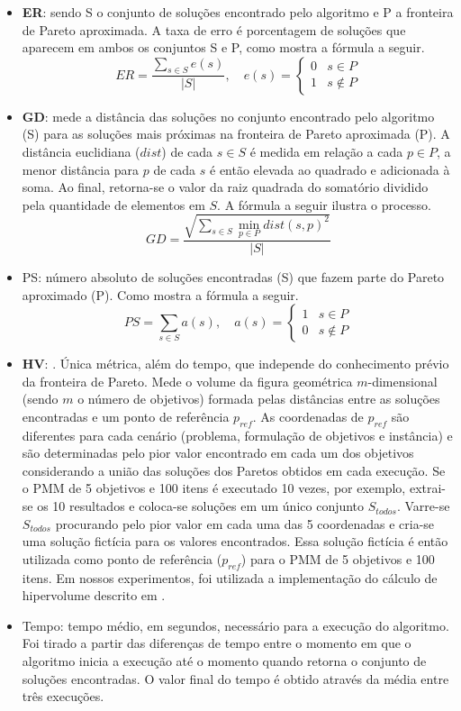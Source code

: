 \begin{itemize}
	\item \textbf{\ac{ER}}: sendo S o conjunto de soluções encontrado pelo algoritmo e P a fronteira de Pareto aproximada. A taxa de erro é porcentagem de soluções que aparecem em ambos os conjuntos S e P, como mostra a fórmula a seguir.
	\[
		ER = \frac{\sum\limits_{s \in S} e(s)}{|S|}, \quad
		e(s) = 
		\begin{cases} 
			0 & s \in P \\
			1 & s \notin P
		\end{cases}
	\]
	\item \textbf{\ac{GD}}: mede a distância das soluções no conjunto encontrado pelo algoritmo (S) para as soluções mais próximas na fronteira de Pareto aproximada (P). A distância euclidiana ($dist$) de cada $s \in S$ é medida em relação a cada $p \in P$, a menor distância para $p$ de cada $s$ é então elevada ao quadrado e adicionada à soma. Ao final, retorna-se o valor da raiz quadrada do somatório dividido pela quantidade de elementos em $S$. A fórmula a seguir ilustra o processo.
	 \[GD = \frac{\sqrt{\sum\limits_{s \in S} \min\limits_{p \in P} dist(s, p)^2}}{|S|}\]
	\item \ac{PS}: número absoluto de soluções encontradas (S) que fazem parte do Pareto aproximado (P). Como mostra a fórmula a seguir.
	\[
		PS = \sum\limits_{s \in S} a(s), \quad
		a(s) = 
		\begin{cases} 
			1 & s \in P \\
			0 & s \notin P
		\end{cases}
	\]
	\item \textbf{\ac{HV}}: \cite{Bradstreet2012}. Única métrica, além do tempo, que independe do conhecimento prévio da fronteira de Pareto. Mede o volume da figura geométrica $m$-dimensional (sendo $m$ o número de objetivos) formada pelas distâncias entre as soluções encontradas e um ponto de referência $p_{ref}$. As coordenadas de $p_{ref}$ são diferentes para cada cenário (problema, formulação de objetivos e instância) e são determinadas pelo pior valor encontrado em cada um dos objetivos considerando a união das soluções dos Paretos obtidos em cada execução. Se o PMM de 5 objetivos e 100 itens é executado 10 vezes, por exemplo, extrai-se os 10 resultados e coloca-se soluções em um único conjunto $S_{todos}$. Varre-se $S_{todos}$ procurando pelo pior valor em cada uma das 5 coordenadas e cria-se uma solução fictícia para os valores encontrados. Essa solução fictícia é então utilizada como ponto de referência ($p_{ref}$) para o PMM de 5 objetivos e 100 itens. Em nossos experimentos, foi utilizada a implementação do cálculo de hipervolume descrito em \cite{Bradstreet2012}.
	\item Tempo: tempo médio, em segundos, necessário para a execução do algoritmo. Foi tirado a partir das diferenças de tempo entre o momento em que o algoritmo inicia a execução até o momento quando retorna o conjunto de soluções encontradas. O valor final do tempo é obtido através da média entre três execuções.
\end{itemize}

